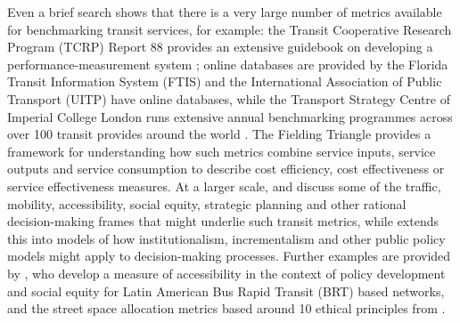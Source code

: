 \documentclass[numbered]{trbunofficial}
\begin{document}
Even a brief search shows that there is a very large number of metrics
available for benchmarking transit services, for example: the Transit
Cooperative Research Program (TCRP) Report 88 provides an extensive
guidebook on developing a performance-measurement system
\citep{Ryus:2003aa}; online databases are provided by the Florida
Transit Information System (FTIS)
\citep{Florida-Transit-Information-System:2018aa} and the International
Association of Public Transport (UITP) \citep{UITP:2015aa} have online
databases, while the Transport Strategy Centre of Imperial College
London runs extensive annual benchmarking programmes across over 100
transit provides around the world
\citep{Imperial-College-London:2023aa}. The Fielding Triangle
\citep{FieldingGordonJ1987Mpts} provides a framework for understanding
how such metrics combine service inputs, service outputs and service
consumption to describe cost efficiency, cost effectiveness or service
effectiveness measures. At a larger scale, \citet{Litman:2003ab} and
\citet{Litman:2016aa} discuss some of the traffic, mobility,
accessibility, social equity, strategic planning and other rational
decision-making frames that might underlie such transit metrics, while
\citet{Reynolds:2017ah} extends this into models of how
institutionalism, incrementalism and other public policy models might
apply to decision-making processes. Further examples are provided by
\citet{GuzmanLuisA.2017Aeit}, who develop a measure of accessibility in
the context of policy development and social equity for Latin American
Bus Rapid Transit (BRT) based networks, and the street space allocation
metrics based around 10 ethical principles from
\citet{Creutzig2020streetspaceallocation}.
\end{document}
